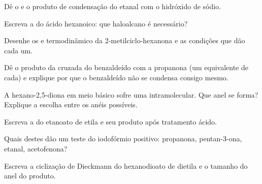 \begin{exercise}[$\star$]\label{exo:b2:enolates-aldol:3}
Dê o  e o produto de condensação do etanal com o hidróxido de sódio.
\end{exercise}

\begin{exercise}[$\star$]\label{exo:b2:enolates-aldol:4}
Escreva a  do ácido hexanoico: que haloalcano é necessário?
\end{exercise}

\begin{exercise}[$\star\star$]\label{exo:b2:enolates-aldol:5}
Desenhe os  e termodinâmico da 2-metilciclo-hexanona e as condições que dão
cada um.
\end{exercise}

\begin{exercise}[$\star\star$]\label{exo:b2:enolates-aldol:6}
Dê o produto da  cruzada do benzaldeído com a propanona (um equivalente de
cada) e explique por que o benzaldeído não se condensa consigo mesmo.
\end{exercise}

\begin{exercise}[$\star\star$]\label{exo:b2:enolates-aldol:7}
A hexano-2,5-diona em meio básico sofre uma  intramolecular. Que anel se forma?
Explique a escolha entre os anéis possíveis.
\end{exercise}

\begin{exercise}[$\star\star$]\label{exo:b2:enolates-aldol:8}
Escreva a  do etanoato de etila e seu produto após tratamento ácido.
\end{exercise}

\begin{exercise}[$\star\star$]\label{exo:b2:enolates-aldol:9}
Quais destes dão um teste do iodofórmio positivo: propanona, pentan-3-ona, etanal, acetofenona?
\end{exercise}

\begin{exercise}[$\star\star\star$]\label{exo:b2:enolates-aldol:10}
Escreva a ciclização de Dieckmann do hexanodioato de dietila e o tamanho do anel do produto.
\end{exercise}

